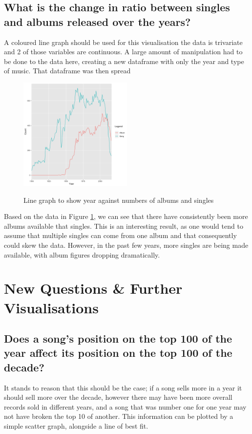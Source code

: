 \documentclass[12pt]{article}
\newcommand{\myfig}{\begin{figure}}
\begin{document}
\subsection{What is the change in ratio between singles and albums released over the years?}
        A coloured line graph should be used for this visualisation the data is trivariate and 2 of those variables are continuous.
        A large amount of manipulation had to be done to the data here, creating a new dataframe with only the year and type of music.
        That dataframe was then spread
        \myfig
          \caption{Line graph to show year against numbers of albums and singles}
          \includegraphics[width=0.5\textwidth]{singlesAlbums}
          \label{fig:q3}
        \end{figure}
        Based on the data in Figure \ref{fig:q3}, we can see that there have consistently been more albums available that singles.
        This is an interesting result, as one would tend to assume that multiple singles can come from one album and that consequently could skew the data.
        However, in the past few years, more singles are being made available, with album figures dropping dramatically.

\pagebreak

\section{New Questions \& Further Visualisations}
    \subsection{Does a song's position on the top 100 of the year affect its position on the top 100 of the decade?}
        It stands to reason that this should be the case; if a song sells more in a year it should sell more over the decade, however there may have been more overall records sold in different years, and a song that was number one for one year may not have broken the top 10 of another.
        This information can be plotted by a simple scatter graph, alongside a line of best fit.
\end{document}
